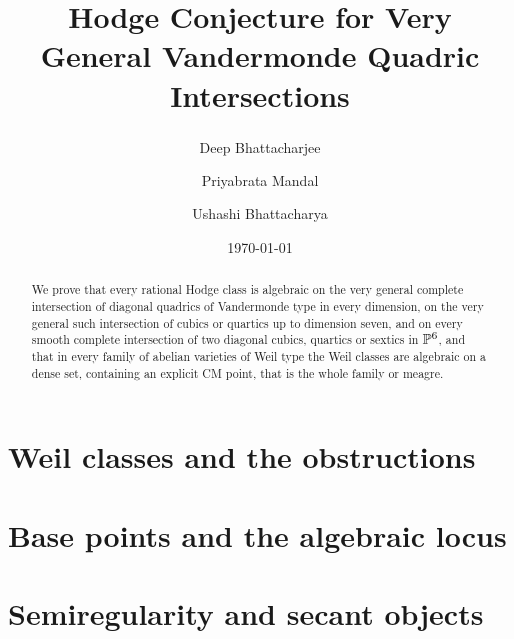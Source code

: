 \documentclass[11pt,reqno]{amsart}
\title[Hodge conjecture for Vandermonde quadric intersections]
      {Hodge Conjecture for Very General Vandermonde Quadric Intersections}
\author{Deep Bhattacharjee\textsuperscript{\dag}}
\author{Priyabrata Mandal}
\author{Ushashi Bhattacharya}
\date{\today}
\begin{document}
\begin{abstract}
We prove that every rational Hodge class is algebraic on the very general
complete intersection of diagonal quadrics of Vandermonde type in every
dimension, on the very general such intersection of cubics or quartics up to
dimension seven, and on every smooth complete intersection of two diagonal
cubics, quartics or sextics in $\mathbb{P}^{6}$, and that in every family of
abelian varieties of Weil type the Weil classes are algebraic on a dense
set, containing an explicit CM point, that is the whole family or meagre.
\end{abstract}

\maketitle

\setcounter{tocdepth}{0}
\vspace*{-18pt}
\begingroup
\setlength{\parskip}{0pt}
\tableofcontents
\endgroup
\vspace*{-4pt}



\part{Weil classes and the obstructions}\label{part:obstructions}













\part{Base points and the algebraic locus}\label{part:basepoints}





\part{Semiregularity and secant objects}\label{part:semiregularity}




\end{document}
